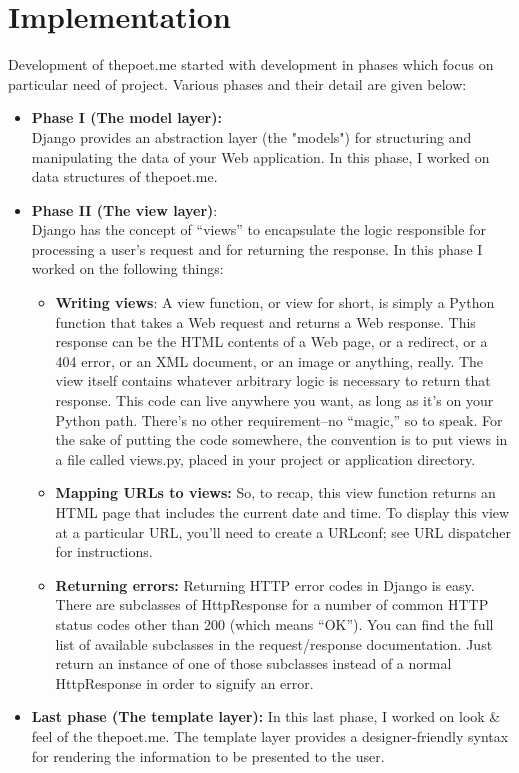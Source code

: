 \section{Implementation}
Development of thepoet.me started with development in phases which focus on particular need of project.
Various phases and their detail are given below:

\begin{itemize}

\item \textbf{Phase I (The model layer):}\\Django provides an abstraction layer (the "models") for structuring and manipulating the data of your Web application. In this phase, I worked on data structures of thepoet.me.

\item \textbf{Phase II (The view layer)}:\\Django has the concept of “views” to encapsulate the logic responsible for processing a user’s request and for returning the response. In this phase I worked on the following things:

\begin{itemize}
\item \textbf{Writing views}: A view function, or view for short, is simply a Python function that takes a Web request and returns a Web response. This response can be the HTML contents of a Web page, or a redirect, or a 404 error, or an XML document, or an image or anything, really. The view itself contains whatever arbitrary logic is necessary to return that response. This code can live anywhere you want, as long as it’s on your Python path. There’s no other requirement–no “magic,” so to speak. For the sake of putting the code somewhere, the convention is to put views in a file called views.py, placed in your project or application directory.
\item \textbf{Mapping URLs to views:} So, to recap, this view function returns an HTML page that includes the current date and time. To display this view at a particular URL, you’ll need to create a URLconf; see URL dispatcher for instructions.
\item \textbf{Returning errors:} Returning HTTP error codes in Django is easy. There are subclasses of HttpResponse for a number of common HTTP status codes other than 200 (which means “OK”). You can find the full list of available subclasses in the request/response documentation. Just return an instance of one of those subclasses instead of a normal HttpResponse in order to signify an error.
\end{itemize}

\item \textbf{Last phase (The template layer):} In this last phase, I worked on look \& feel of the thepoet.me. The template layer provides a designer-friendly syntax for rendering the information to be presented to the user.

\end{itemize}

